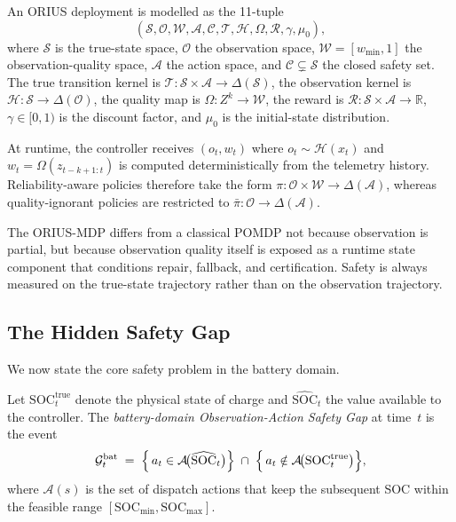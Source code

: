 \begin{definition}
\label{def:orius-mdp-merged}
An ORIUS deployment is modelled as the 11-tuple
\[
  (\mathcal{S}, \mathcal{O}, \mathcal{W}, \mathcal{A}, \mathcal{C},
   \mathcal{T}, \mathcal{H}, \Omega, \mathcal{R}, \gamma, \mu_0),
\]
where $\mathcal{S}$ is the true-state space, $\mathcal{O}$ the observation
space, $\mathcal{W}=[w_{\min},1]$ the observation-quality space,
$\mathcal{A}$ the action space, and $\mathcal{C}\subsetneq\mathcal{S}$ the
closed safety set.  The true transition kernel is
$\mathcal{T}: \mathcal{S}\times\mathcal{A}\to\Delta(\mathcal{S})$, the
observation kernel is $\mathcal{H}: \mathcal{S}\to\Delta(\mathcal{O})$, the
quality map is $\Omega: Z^k\to\mathcal{W}$, the reward is
$\mathcal{R}: \mathcal{S}\times\mathcal{A}\to\mathbb{R}$, $\gamma\in[0,1)$ is
the discount factor, and $\mu_0$ is the initial-state distribution.

At runtime, the controller receives $(o_t,w_t)$ where
$o_t\sim\mathcal{H}(x_t)$ and $w_t=\Omega(z_{t-k+1:t})$ is computed
deterministically from the telemetry history.  Reliability-aware policies
therefore take the form $\pi:\mathcal{O}\times\mathcal{W}\to\Delta(\mathcal{A})$,
whereas quality-ignorant policies are restricted to
$\bar{\pi}:\mathcal{O}\to\Delta(\mathcal{A})$.
\end{definition}

\begin{remark}
The ORIUS-MDP differs from a classical POMDP not because observation is
partial, but because observation quality itself is exposed as a runtime state
component that conditions repair, fallback, and certification.  Safety is
always measured on the true-state trajectory rather than on the observation
trajectory.
\end{remark}

\subsection{The Hidden Safety Gap}
\label{sec:hidden-gap}

We now state the core safety problem in the battery domain.

\begin{definition}
\label{def:battery-oasg}
Let $\mathrm{SOC}_t^{\mathrm{true}}$ denote the physical state of charge
and $\widehat{\mathrm{SOC}}_t$ the value available to the controller.
The \emph{battery-domain Observation-Action Safety Gap} at time~$t$ is the
event
\[
  \mathcal{G}_t^{\mathrm{bat}} \;=\;
  \Bigl\{\,a_t \in \mathcal{A}\!\bigl(\widehat{\mathrm{SOC}}_t\bigr)\Bigr\}
  \;\cap\;
  \Bigl\{\,a_t \notin \mathcal{A}\!\bigl(\mathrm{SOC}_t^{\mathrm{true}}\bigr)\Bigr\},
\]
where $\mathcal{A}(s)$ is the set of dispatch actions that keep the
subsequent SOC within the feasible range $[\mathrm{SOC}_{\min},
\mathrm{SOC}_{\max}]$.
\end{definition}

